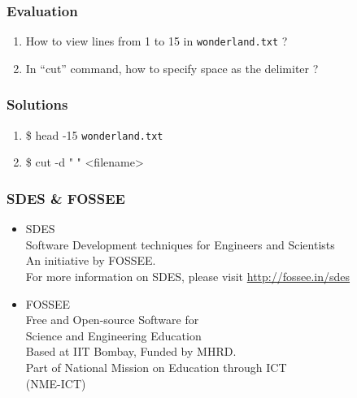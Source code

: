 \documentclass[17pt,compress]{beamer}
\begin{document}
\begin{frame}[fragile]
\frametitle{Evaluation}
\label{sec-9}


\begin{enumerate}
\item How to view lines from 1 to 15 in \verb~wonderland.txt~ ?
\vspace{15pt}
\item In ``cut'' command, how to specify space as the delimiter ? 
\end{enumerate}
\end{frame}
\begin{frame}
\frametitle{Solutions}
\label{sec-10}


\begin{enumerate}
\item \$ head -15 \verb~wonderland.txt~
\vspace{15pt}
\item \$ cut -d " " <filename>
\end{enumerate}
\end{frame}

\begin{frame}
\frametitle{SDES \& FOSSEE}
\begin{center}
\begin{itemize}
\item \small{SDES}\\
\small{\color{LimeGreen}Software Development techniques for Engineers and Scientists} \\
\scriptsize An initiative by FOSSEE. \\
\vspace{3pt}
\scriptsize For more information on SDES, please visit {\color{blue}\url{http://fossee.in/sdes}}\\
\vspace{10pt}
\item \small{FOSSEE}\\
\small {\color{LimeGreen}Free and Open-source Software for \\Science and Engineering Education} \\
\scriptsize Based at IIT Bombay, Funded by MHRD.\\
\vspace{3pt}
\scriptsize Part of National Mission on Education through ICT \\(NME-ICT) \\
\end{itemize}
\end{center}
\end{frame}
\end{document}
